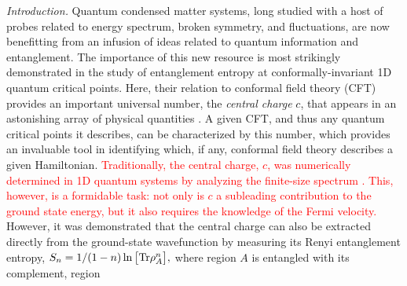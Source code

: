 \documentclass[prl,aps,twocolumn,floatfix,amsmath,amssymb,superscriptaddress,tightenlines]{revtex4}
\begin{document}
{\it Introduction.} Quantum condensed matter systems, long studied with a host of probes related to energy spectrum, broken symmetry,
and fluctuations, are now benefitting from an infusion of ideas related to quantum information and entanglement.
The importance of this new resource is most strikingly 
demonstrated in the study of entanglement entropy at conformally-invariant 1D quantum critical points.
Here, their relation to conformal field theory (CFT) provides an important
universal number, the {\it central charge} $c$, that appears in an astonishing array of physical
quantities \cite{Cardyubiquitous}. A given CFT, and
thus any quantum critical points it describes, can be
characterized by this number,
which provides an invaluable tool in identifying which, if any, conformal field
theory describes a given Hamiltonian. 
\textcolor{red}{Traditionally, the central charge, $c$, was numerically determined in 1D quantum systems by analyzing the finite-size spectrum \cite{BCN,Affleck}.
This, however, is a formidable task: not only is $c$ a subleading contribution to the ground state energy, but it also requires the knowledge of the Fermi velocity.}
%
%
However, it was demonstrated \cite{Holzhey, VidalC} that the central charge can also be extracted 
directly from the ground-state wavefunction by measuring its Renyi
entanglement entropy, $ S_n = 1/(1-n) \ln \big[ {\rm Tr} \rho_A^n
\big], $ where region $A$ is entangled with its complement, region
\end{document}
